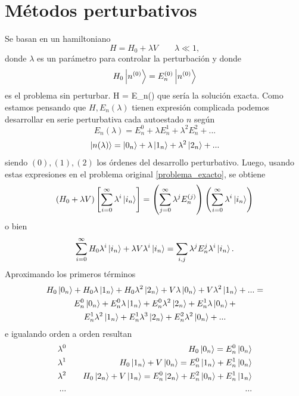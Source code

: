 \documentclass[10pt,oneside]{CBFT_book}
\begin{document}
\chapter{Métodos perturbativos}

Se basan en un hamiltoniano
\[
	H = H_0 + \lambda V \qquad \lambda \ll 1, 
\]
donde $\lambda$ es un parámetro para controlar la perturbación y donde
\[
	H_0\Ket{n^{(0)}} = E_n^{(0)}\Ket{n^{(0)}}
\]
es el problema sin perturbar.
\be
	H  = E_n(\lambda) 
	\label{problema_exacto}
\ee
que sería la solución exacta.
Como estamos pensando que $H, E_n(\lambda)$ tienen expresión complicada podemos desarrollar en serie 
perturbativa cada autoestado $n$ según
\[
	E_n(\lambda) = E_n^0 + \lambda E_n^1 + \lambda^2 E_n^2  + ...
\]
\[
	\Ket{n(\lambda)} = \Ket{0_n} + \lambda \Ket{1_n} + \lambda^2  \Ket{2_n} + ...
\]
siendo $(0),(1),(2)$ los órdenes del desarrollo perturbativo.
Luego, usando estas expresiones en el problema original \eqref{problema_exacto}, se obtiene
\[
	\left( H_0 + \lambda V \right)\left[ \sum_{i=0}^{\infty} \lambda^i\Ket{i_n} \right] =
	\left(\sum_{j=0}^{\infty} \lambda^j E_n^{(j)}\right) 
	\left(\sum_{i=0}^{\infty} \lambda^i\Ket{i_n}\right)
\]
o bien
\[
	\sum_{i=0}^\infty H_0 \lambda^i \Ket{i_n} + \lambda V \lambda^i \Ket{i_n} =
	\sum_{i,j} \lambda^j E_n^j \lambda^i \Ket{i_n}.
\]
Aproximando los primeros términos 
\begin{multline*}
	H_0\Ket{0_n} + H_0\lambda\Ket{1_n} + H_0\lambda^2\Ket{2_n} + V\lambda\Ket{0_n} +
	V\lambda^2\Ket{1_n}+... = \\
	E_n^0\Ket{0_n} + E_n^0\lambda\Ket{1_n} + E_n^0\lambda^2\Ket{2_n} + E_n^1\lambda\Ket{0_n} + \\ 
	E_n^1\lambda^2\Ket{1_n} + E_n^1\lambda^3\Ket{2_n} + E_n^2\lambda^2\Ket{0_n} + ...
\end{multline*}
e igualando orden a orden resultan
\begin{eqnarray*}
 	\lambda^0 & \quad & H_0\Ket{0_n}  = E_n^0\Ket{0_n} \\
 	\lambda^1 & \quad & H_0\Ket{1_n} + V\Ket{0_n} = E_n^0\Ket{1_n} + E_n^1\Ket{0_n}  \\
 	\lambda^2 & \quad & H_0\Ket{2_n} + V\Ket{1_n} = E_n^0\Ket{2_n} + E_n^2\Ket{0_n} + E_n^1\Ket{1_n} \\
 	... & \quad & ...
\end{eqnarray*}
\end{document}
